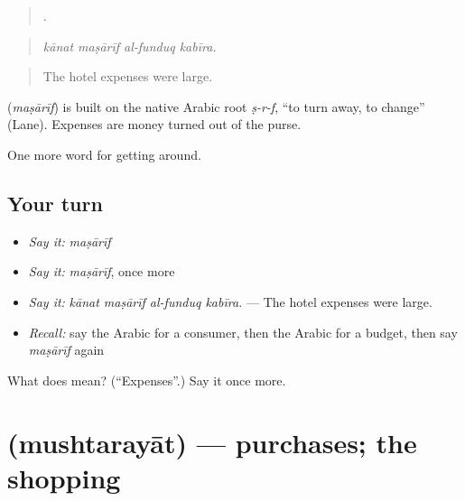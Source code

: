 \begin{quote}
   .
\end{quote}

\begin{quote}
\emph{kānat maṣārīf al-funduq kabīra.}
\end{quote}

\begin{quote}
The hotel expenses were large.
\end{quote}

\begin{cousinweb}
\textbf{} (\emph{maṣārīf}) is built on the native Arabic root \emph{ṣ-r-f}, \textquotedblleft{}to turn away, to change\textquotedblright{} (Lane). Expenses are money turned out of the purse.
\end{cousinweb}

\begin{grammarlens}[title={What you've built}]
One more word for getting around.
\end{grammarlens}

\subsection*{Your turn}
\begin{itemize}
\raggedright
  \item \emph{Say it:} \emph{maṣārīf}
  \item \emph{Say it:} \emph{maṣārīf}, once more
  \item \emph{Say it:} \emph{kānat maṣārīf al-funduq kabīra.} — The hotel expenses were large.
  \item \emph{Recall:} say the Arabic for a consumer, then the Arabic for a budget, then say \emph{maṣārīf} again
\end{itemize}

\begin{tcolorbox}[breakable,colback=teal!4,colframe=teal!35!black,title={Before you move on}]
What does  mean? (\textquotedblleft{}Expenses\textquotedblright{}.) Say it once more.
\end{tcolorbox}
\section[\texorpdfstring{\ar{مشتريات} (mushtarayāt)}{مشتريات (mushtarayāt)}]{ (mushtarayāt) — purchases; the shopping}

\label{lesson:AR-C459-mushtarayat}



